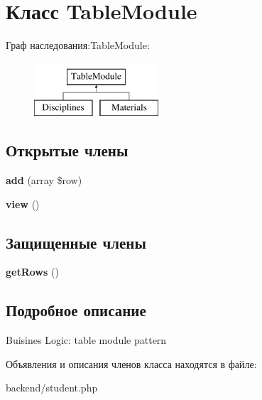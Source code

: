 \hypertarget{classTableModule}{}\section{Класс Table\+Module}
\label{classTableModule}
Граф наследования\+:Table\+Module\+:\begin{figure}[H]
\begin{center}
\leavevmode
\includegraphics[height=2.000000cm]{classTableModule}
\end{center}
\end{figure}
\subsection*{Открытые члены}
\begin{DoxyCompactItemize}
\item 
\hypertarget{classTableModule_a27518974022238398e72de9a827848cd}{}{\bfseries add} (array \$row)\label{classTableModule_a27518974022238398e72de9a827848cd}

\item 
\hypertarget{classTableModule_accce62f4d1a5cb55b004552d62a610d0}{}{\bfseries view} ()\label{classTableModule_accce62f4d1a5cb55b004552d62a610d0}

\end{DoxyCompactItemize}
\subsection*{Защищенные члены}
\begin{DoxyCompactItemize}
\item 
\hypertarget{classTableModule_a751eb37cbca98bf3457ccfaa36b1416a}{}{\bfseries get\+Rows} ()\label{classTableModule_a751eb37cbca98bf3457ccfaa36b1416a}

\end{DoxyCompactItemize}


\subsection{Подробное описание}
Buisines Logic\+: table module pattern 

Объявления и описания членов класса находятся в файле\+:\begin{DoxyCompactItemize}
\item 
backend/student.\+php\end{DoxyCompactItemize}
